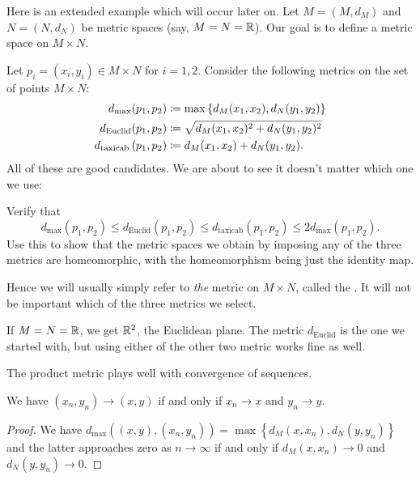 Here is an extended example which will occur later on.
Let $M = (M, d_M)$ and $N = (N, d_N)$ be metric spaces (say, $M = N = \mathbb R$).
Our goal is to define a metric space on $M \times N$.

Let $p_i = (x_i,y_i) \in M \times N$ for $i=1,2$.
Consider the following metrics on the set of points $M \times N$:
\begin{align*}
	d_{\text{max}} ( p_1, p_2 )
		&\coloneqq \max \left\{ d_M(x_1, x_2), d_N(y_1, y_2) \right\}  \\
	d_{\text{Euclid}} ( p_1, p_2 )
		&\coloneqq \sqrt{d_M(x_1,x_2)^2 + d_N(y_1, y_2)^2} \\
	d_{\text{taxicab}} \left( p_1, p_2 \right)
		&\coloneqq d_M(x_1, x_2) + d_N(y_1, y_2).
\end{align*}
All of these are good candidates.
We are about to see it doesn't matter which one we use:
\begin{exercise}
Verify that
\[ d_{\text{max}}(p_1,p_2)
	\le d_{\text{Euclid}}(p_1, p_2)
	\le d_{\text{taxicab}}(p_1, p_2)
	\le 2d_{\text{max}}(p_1, p_2). \]
Use this to show that the metric spaces we obtain
by imposing any of the three metrics are homeomorphic,
with the homeomorphism being just the identity map.
\end{exercise}

\begin{definition}
	Hence we will usually simply refer to
	\emph{the} metric on $M \times N$,
	called the .
	It will not be important which of the three metrics we select.
\end{definition}

\begin{example}[$\RR^2$]
	If $M = N = \mathbb R$, we get $\RR^2$, the Euclidean plane.
	The metric $d_{\text{Euclid}}$ is the one we started with,
	but using either of the other two metric works fine as well.
\end{example}

The product metric plays well with convergence of sequences.
\begin{proposition}
	We have $(x_n, y_n) \to (x,y)$
	if and only if $x_n \to x$ and $y_n \to y$.
\end{proposition}
\begin{proof}
	We have $d_{\text{max}} \left( (x,y), (x_n, y_n) \right)
	= \max\left\{ d_M(x, x_n), d_N(y, y_n) \right\}$
	and the latter approaches zero as $n \to \infty$
	if and only if $d_M(x,x_n) \to 0$ and $d_N(y, y_n) \to 0$.
\end{proof}

